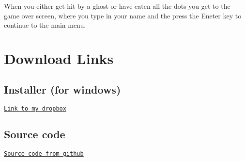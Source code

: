 When you either get hit by a ghost or have eaten all the dots you get to the game over screen, where you type in your name and the press the Eneter key to continue to the main menu. \hypertarget{index_downloads}{}\section{Download Links}\label{index_downloads}
\hypertarget{index_installer}{}\subsection{Installer (for windows)}\label{index_installer}
\href{https://www.dropbox.com/sh/60xej135ncpfk4z/J19aQo8Ps-/program%20files/Pac-Man/Pac-SetUp}{\tt Link to my dropbox} \hypertarget{index_source}{}\subsection{Source code}\label{index_source}
\href{https://github.com/oru-johlah123/oru-johlah123}{\tt Source code from github} 